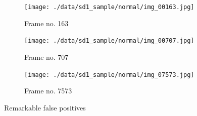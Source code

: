\begin{figure}[H]
    \centering
    \begin{subfigure}{0.48\textwidth}
        \centering
        \texttt{[image: ./data/sd1\_sample/normal/img\_00163.jpg]}
        \caption*{Frame no. 163}
    \end{subfigure}
    \begin{subfigure}{0.48\textwidth}
        \centering
        \texttt{[image: ./data/sd1\_sample/normal/img\_00707.jpg]}
        \caption*{Frame no. 707}
    \end{subfigure}
    \begin{subfigure}{0.48\textwidth}
        \centering
        \texttt{[image: ./data/sd1\_sample/normal/img\_07573.jpg]}
        \caption*{Frame no. 7573}
    \end{subfigure}
    \caption{Remarkable false positives}
    \label{fig:false_positives}
\end{figure}